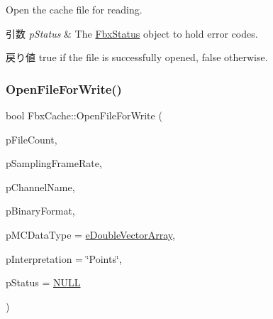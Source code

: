 Open the cache file for reading. 
\begin{DoxyParams}{引数}
{\em p\+Status} & The \hyperlink{class_fbx_status}{Fbx\+Status} object to hold error codes. \\
\hline
\end{DoxyParams}
\begin{DoxyReturn}{戻り値}
{\ttfamily true} if the file is successfully opened, {\ttfamily false} otherwise. 
\end{DoxyReturn}
\mbox{\label{class_fbx_cache_a430c418e921a876f442c064b301418be}} 
\subsubsection{\texorpdfstring{Open\+File\+For\+Write()}{OpenFileForWrite()}\hspace{0.1cm}{\footnotesize\ttfamily [1/2]}}
{\footnotesize\ttfamily bool Fbx\+Cache\+::\+Open\+File\+For\+Write (\begin{DoxyParamCaption}\item[{\hyperlink{class_fbx_cache_afa5d133385fbd74b59e619c692a9cc36}{E\+M\+C\+File\+Count}}]{p\+File\+Count,  }\item[{double}]{p\+Sampling\+Frame\+Rate,  }\item[{const char $\ast$}]{p\+Channel\+Name,  }\item[{\hyperlink{class_fbx_cache_af3afea849dd371f0b5ecbe135d34b829}{E\+M\+C\+Binary\+Format}}]{p\+Binary\+Format,  }\item[{\hyperlink{class_fbx_cache_a80f82fa5f485ff6c46565ffb151998b3}{E\+M\+C\+Data\+Type}}]{p\+M\+C\+Data\+Type = {\ttfamily \hyperlink{class_fbx_cache_a80f82fa5f485ff6c46565ffb151998b3a650d3bda5d6886776bee42118f711cb3}{e\+Double\+Vector\+Array}},  }\item[{const char $\ast$}]{p\+Interpretation = {\ttfamily \char`\"{}Points\char`\"{}},  }\item[{\hyperlink{class_fbx_status}{Fbx\+Status} $\ast$}]{p\+Status = {\ttfamily \hyperlink{fbxarch_8h_a070d2ce7b6bb7e5c05602aa8c308d0c4}{N\+U\+LL}} }\end{DoxyParamCaption})}

